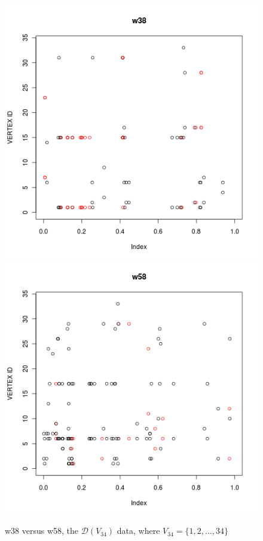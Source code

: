 \documentclass[12pt]{article}%
\begin{document}
 
\begin{figure}
\begin{center}
\includegraphics[scale=0.30]{v34_myDdata_w38.png}
\includegraphics[scale=0.30]{v34_myDdata_w58.png}
\end{center}
\caption{w38 versus w58, the $\mathcal D(V_{34})$ data, where $V_{34} =\{1,2,\ldots, 34\}$}
\label{theDplot}
\end{figure}
\end{document}

